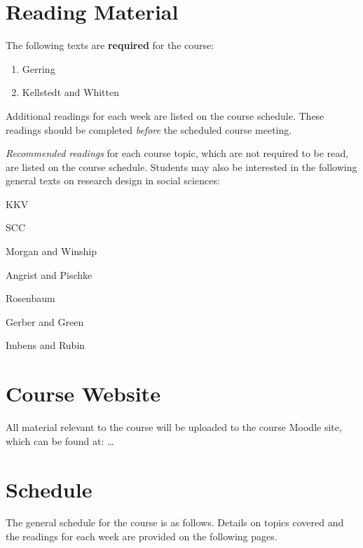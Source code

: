 \documentclass[12pt,a4paper]{article}
\begin{document}



\clearpage
\section{Reading Material}

The following texts are \textbf{required} for the course:

\begin{enumerate}
\item Gerring
\item Kellstedt and Whitten
\end{enumerate}

Additional readings for each week are listed on the course schedule. These readings should be completed \textit{before} the scheduled course meeting.

\textit{Recommended readings} for each course topic, which are not required to be read, are listed on the course schedule. Students may also be interested in the following general texts on research design in social sciences:

\begin{enumerate*}
\item KKV
\item SCC
\item Morgan and Winship
\item Angrist and Pischke
\item Rosenbaum
\item Gerber and Green
\item Imbens and Rubin
\end{enumerate*}



\section{Course Website}

All material relevant to the course will be uploaded to the course Moodle site, which can be found at: \dots


\clearpage
\section{Schedule}
The general schedule for the course is as follows. Details on topics covered and the readings for each week are provided on the following pages.
\end{document}
